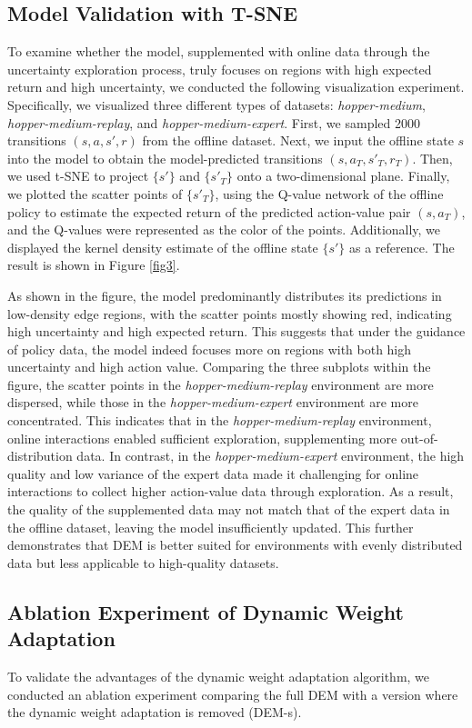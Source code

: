 \documentclass[letterpaper]{article} %
\begin{document}
\subsection{Model Validation with T-SNE}
To examine whether the model, supplemented with online data through the uncertainty exploration process, truly focuses on regions with high expected return and high uncertainty, we conducted the following visualization experiment. Specifically, we visualized three different types of datasets: \textit{hopper-medium}, \textit{hopper-medium-replay}, and \textit{hopper-medium-expert}. First, we sampled 2000 transitions $(s, a, s', r)$ from the offline dataset. Next, we input the offline state $s$ into the model to obtain the model-predicted transitions $(s, a_T, s'_T, r_T)$. Then, we used t-SNE \cite{tsne} to project $\{s'\}$ and $\{s'_T\}$ onto a two-dimensional plane. Finally, we plotted the scatter points of $\{s'_T\}$, using the Q-value network of the offline policy to estimate the expected return of the predicted action-value pair $(s, a_T)$, and the Q-values were represented as the color of the points. Additionally, we displayed the kernel density estimate of the offline state $\{s'\}$ as a reference. The result is shown in Figure \ref{fig3}.

As shown in the figure, the model predominantly distributes its predictions in low-density edge regions, with the scatter points mostly showing red, indicating high uncertainty and high expected return. This suggests that under the guidance of policy data, the model indeed focuses more on regions with both high uncertainty and high action value. Comparing the three subplots within the figure, the scatter points in the \textit{hopper-medium-replay} environment are more dispersed, while those in the \textit{hopper-medium-expert} environment are more concentrated. This indicates that in the \textit{hopper-medium-replay} environment, online interactions enabled sufficient exploration, supplementing more out-of-distribution data. In contrast, in the \textit{hopper-medium-expert} environment, the high quality and low variance of the expert data made it challenging for online interactions to collect higher action-value data through exploration. As a result, the quality of the supplemented data may not match that of the expert data in the offline dataset, leaving the model insufficiently updated. This further demonstrates that DEM is better suited for environments with evenly distributed data but less applicable to high-quality datasets.

\subsection{Ablation Experiment of Dynamic Weight Adaptation}
To validate the advantages of the dynamic weight adaptation algorithm, we conducted an ablation experiment comparing the full DEM with a version where the dynamic weight adaptation is removed (DEM-s).
\end{document}
